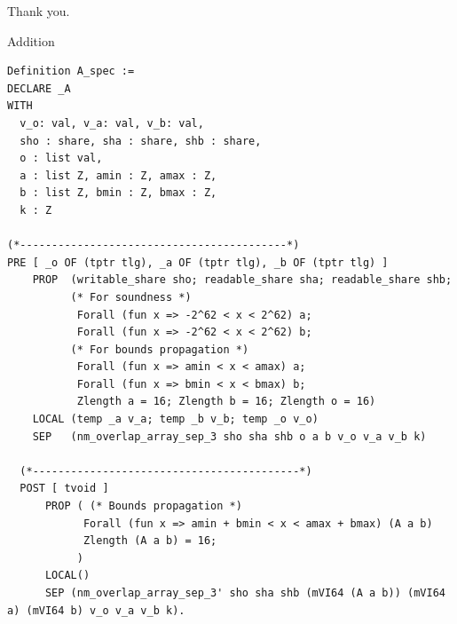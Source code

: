 \documentclass[8pt]{beamer}
\begin{document}
%
%
\begin{frame}[standout]
	\Huge Thank you.
\end{frame}


\appendix


\begin{frame}[fragile]{Addition}
\begin{center}
\begin{lstlisting}[language=CoqVST]
Definition A_spec :=
DECLARE _A
WITH
  v_o: val, v_a: val, v_b: val,
  sho : share, sha : share, shb : share,
  o : list val,
  a : list Z, amin : Z, amax : Z,
  b : list Z, bmin : Z, bmax : Z,
  k : Z

(*------------------------------------------*)
PRE [ _o OF (tptr tlg), _a OF (tptr tlg), _b OF (tptr tlg) ]
    PROP  (writable_share sho; readable_share sha; readable_share shb;
          (* For soundness *)
           Forall (fun x => -2^62 < x < 2^62) a;
           Forall (fun x => -2^62 < x < 2^62) b;
          (* For bounds propagation *)
           Forall (fun x => amin < x < amax) a;
           Forall (fun x => bmin < x < bmax) b;
           Zlength a = 16; Zlength b = 16; Zlength o = 16)
    LOCAL (temp _a v_a; temp _b v_b; temp _o v_o)
    SEP   (nm_overlap_array_sep_3 sho sha shb o a b v_o v_a v_b k)

  (*------------------------------------------*)
  POST [ tvoid ]
      PROP ( (* Bounds propagation *)
            Forall (fun x => amin + bmin < x < amax + bmax) (A a b)
            Zlength (A a b) = 16;
           )
      LOCAL()
      SEP (nm_overlap_array_sep_3' sho sha shb (mVI64 (A a b)) (mVI64 a) (mVI64 b) v_o v_a v_b k).
\end{lstlisting}
\end{center}
\end{frame}
\end{document}

